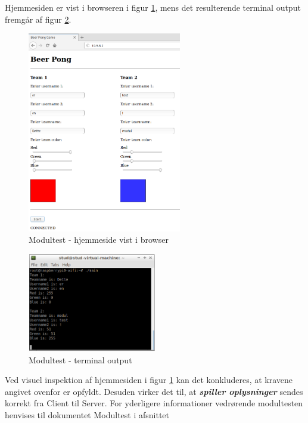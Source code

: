 \documentclass[Rapport/Rapport_main.tex]{subfiles}
\begin{document}
Hjemmesiden er vist i browseren i figur \ref{fig:webpage_modultest_rapport_1}, mens det resulterende terminal output fremgår af figur \ref{fig:webpage_modultest_rapport_2}.
\begin{figure}[H]
    \centering
    \includegraphics[width=0.6\textwidth]{Modultest/WebPage/graphics/modultest_1.png}
    \caption{Modultest - hjemmeside vist i browser}
    \label{fig:webpage_modultest_rapport_1}
\end{figure}
\begin{figure}[H]
    \centering
    \includegraphics[width=0.5\textwidth]{Modultest/WebPage/graphics/modultest_2.png}
    \caption{Modultest - terminal output}
    \label{fig:webpage_modultest_rapport_2}
\end{figure}
Ved visuel inspektion af hjemmesiden i figur \ref{fig:webpage_modultest_rapport_1} kan det konkluderes, at kravene angivet ovenfor er opfyldt. Desuden virker det til, at \textit{\textbf{spiller oplysninger}} sendes korrekt fra Client til Server. For yderligere informationer vedrørende modultesten henvises til dokumentet Modultest i afsnittet 
\end{document}
